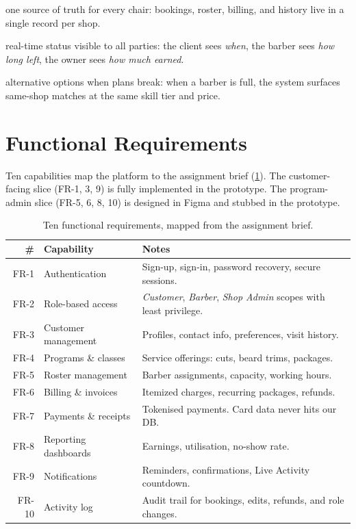 \documentclass[12pt,a4paper]{article}
\begin{document}
\begin{description}[leftmargin=2.2em,style=nextline]
  \item[Centralise] one source of truth for every chair: bookings,
        roster, billing, and history live in a single record per shop.
  \item[Communicate] real-time status visible to all parties: the
        client sees \emph{when}, the barber sees \emph{how long left},
        the owner sees \emph{how much earned}.
  \item[Recover] alternative options when plans break: when a barber
        is full, the system surfaces same-shop matches at the same
        skill tier and price.
\end{description}

\section{Functional Requirements}
\label{sec:fr}

Ten capabilities map the platform to the assignment brief
(\cref{tab:fr}). The customer-facing slice (FR-1, 3, 9) is
fully implemented in the prototype. The program-admin slice
(FR-5, 6, 8, 10) is designed in Figma and stubbed in the prototype.

\begin{table}[H]
\centering\small
\begin{tabular}{@{}rp{4.0cm}p{10cm}@{}}
\toprule
\# & \textbf{Capability} & \textbf{Notes}\\
\midrule
FR-1  & Authentication        & Sign-up, sign-in, password recovery, secure sessions.\\
FR-2  & Role-based access     & \emph{Customer}, \emph{Barber}, \emph{Shop Admin} scopes with least privilege.\\
FR-3  & Customer management   & Profiles, contact info, preferences, visit history.\\
FR-4  & Programs \& classes   & Service offerings: cuts, beard trims, packages.\\
FR-5  & Roster management     & Barber assignments, capacity, working hours.\\
FR-6  & Billing \& invoices   & Itemized charges, recurring packages, refunds.\\
FR-7  & Payments \& receipts  & Tokenised payments. Card data never hits our DB.\\
FR-8  & Reporting dashboards  & Earnings, utilisation, no-show rate.\\
FR-9  & Notifications         & Reminders, confirmations, Live Activity countdown.\\
FR-10 & Activity log          & Audit trail for bookings, edits, refunds, and role changes.\\
\bottomrule
\end{tabular}
\caption{Ten functional requirements, mapped from the assignment
brief.}
\label{tab:fr}
\end{table}
\vspace{-30pt}
\end{document}
